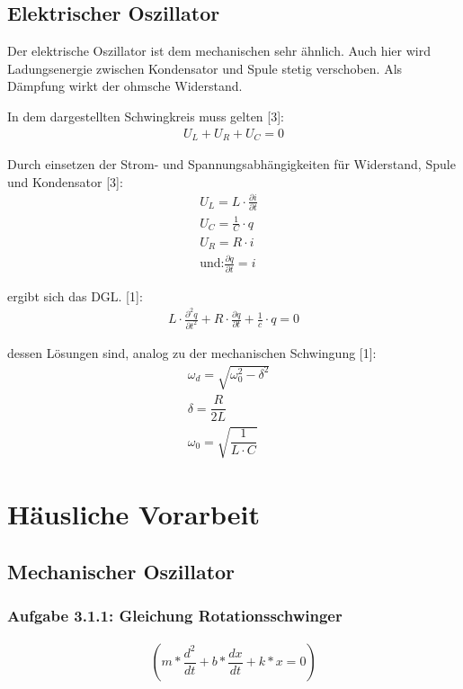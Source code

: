 \documentclass[a4paper]{scrartcl}
\numberwithin{equation}{subsection}
\begin{document}
\subsection{Elektrischer Oszillator}
Der elektrische Oszillator ist dem mechanischen sehr ähnlich. Auch hier wird Ladungsenergie zwischen Kondensator und Spule stetig verschoben. Als Dämpfung wirkt der ohmsche Widerstand. 

In dem dargestellten Schwingkreis muss gelten [3]:
\begin{align}
U_L + U_R + U_C = 0
\end{align}

Durch einsetzen der Strom- und Spannungsabhängigkeiten für Widerstand, Spule und Kondensator [3]:
\begin{align}
U_L = L \cdot \frac{\partial i}{\partial t} &\\
U_C = \frac{1}{C} \cdot q &\\
U_R = R \cdot i &\\
\text{und:} \frac{\partial q}{\partial t} = i &
\end{align}

ergibt sich das DGL. [1]:
\begin{align}
L \cdot \frac{\partial^2 q}{\partial t^2} + R \cdot \frac{\partial q}{\partial t} + \frac{1}{c} \cdot q = 0
\end{align}

dessen Lösungen sind, analog zu der mechanischen Schwingung [1]:
\begin{align}
\omega_d = \sqrt{\omega_0^2 - \delta^2} &\\
\delta = \dfrac{R}{2L} &\\
\omega_0 = \sqrt{\dfrac{1}{L \cdot C}}
\end{align}

\newpage

\section{Häusliche Vorarbeit}
\subsection{Mechanischer Oszillator}
\subsubsection{Aufgabe 3.1.1: Gleichung Rotationsschwinger}

\begin{align}
(m*\dfrac{d^2}{dt} + b*\dfrac{dx}{dt} + k*x = 0)
\end{align}
\end{document}

